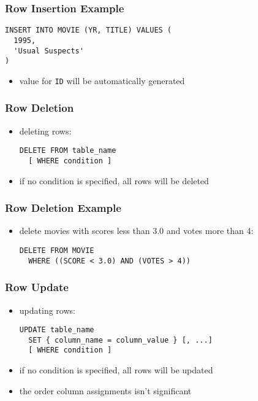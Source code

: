 \documentclass[dvipsnames]{beamer}
\theoremstyle{plain}
\begin{document}
\begin{frame}[fragile]
  \frametitle{Row Insertion Example}

  \begin{lstlisting}
INSERT INTO MOVIE (YR, TITLE) VALUES (
  1995,
  'Usual Suspects'
)
  \end{lstlisting}

  \begin{itemize}
    \item value for \texttt{ID} will be automatically generated
  \end{itemize}
\end{frame}

\begin{frame}[fragile]
  \frametitle{Row Deletion}

  \begin{itemize}
    \item deleting rows:
    \begin{lstlisting}
DELETE FROM table_name
  [ WHERE condition ]
    \end{lstlisting}

    \item if no condition is specified, all rows will be deleted
  \end{itemize}
\end{frame}

\begin{frame}[fragile]
  \frametitle{Row Deletion Example}

  \begin{itemize}
    \item delete movies with scores less than 3.0 and votes more than 4:
    \begin{lstlisting}
DELETE FROM MOVIE
  WHERE ((SCORE < 3.0) AND (VOTES > 4))
    \end{lstlisting}
  \end{itemize}
\end{frame}

\begin{frame}[fragile]
  \frametitle{Row Update}

  \begin{itemize}
    \item updating rows:
    \begin{lstlisting}
UPDATE table_name
  SET { column_name = column_value } [, ...]
  [ WHERE condition ]
    \end{lstlisting}

    \item if no condition is specified, all rows will be updated
    \item the order column assignments isn't significant
  \end{itemize}
\end{frame}
\end{document}
